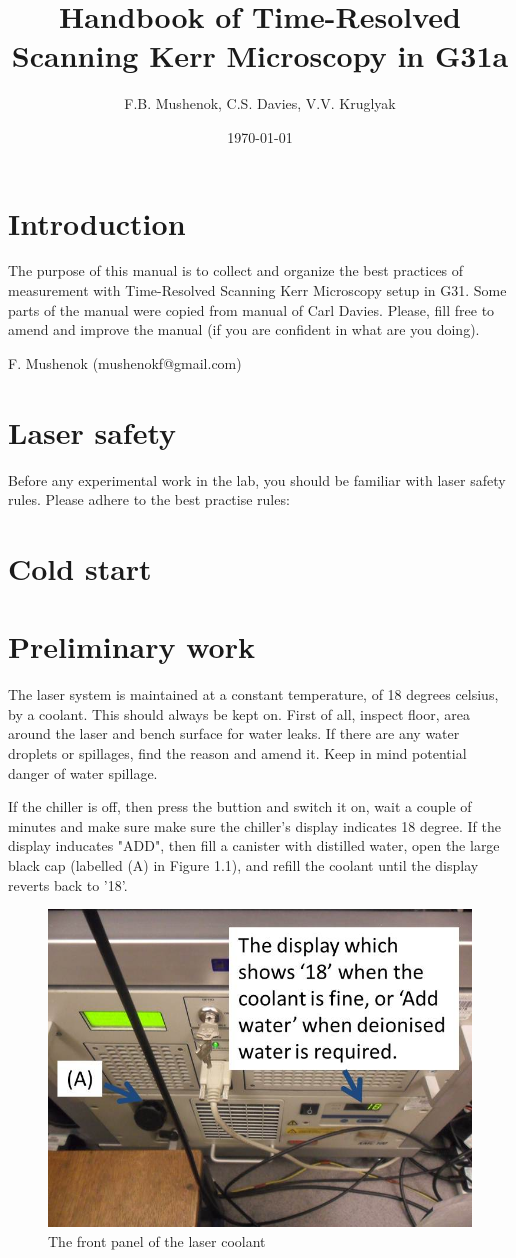 \documentclass[14pt,a4paper] {article}
\begin{document}
\title{Handbook of Time-Resolved Scanning Kerr Microscopy in G31a}

\author{F.B. Mushenok, C.S. Davies, V.V. Kruglyak} 
\date{\today}
\maketitle

\section{Introduction}
 The purpose of this manual is to collect and organize the best practices of measurement with Time-Resolved Scanning Kerr Microscopy setup in G31. Some parts of the manual were copied from manual of Carl Davies.
  Please, fill free to amend and improve the manual (if you are confident in what are you doing).
  
  F. Mushenok (mushenokf@gmail.com)  

\section{Laser safety}
  Before any experimental work in the lab, you should be familiar with laser safety rules. Please adhere to the best practise rules:
   
   
\section{Cold start}

\section{Preliminary work}

The laser system is maintained at a constant temperature, of 18 degrees celsius, by a coolant. This should always be kept on. 
First of all, inspect floor, area around the laser and bench surface for water leaks. If there are any water droplets or spillages, find the reason and amend it. Keep in mind potential danger of water spillage.

If the chiller is off, then press the buttion and switch it on, wait a couple of minutes and make sure make sure the chiller's display indicates 18 degree.  If the display inducates "ADD", then fill a canister with distilled water, open the large black cap (labelled (A) in Figure 1.1), and refill the coolant until the display reverts back to '18'.
\begin{figure}
\includegraphics[width=0.5\linewidth]{Laser-coolant.jpg}
\caption{The front panel of the laser coolant}
\end{figure}
\end{document}
